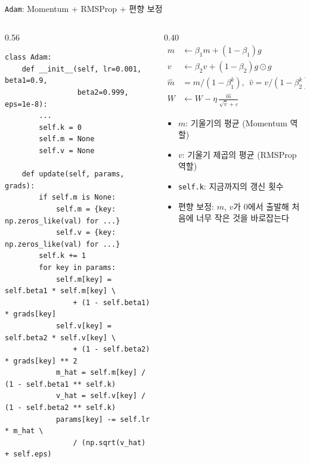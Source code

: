 \documentclass[aspectratio=169,11pt]{beamer}
\newcommand{\codetiny}{\ttfamily\fontsize{6.8}{7.6}\selectfont}
\newcommand{\code}[1]{\texttt{#1}}
\begin{document}
\begin{frame}[fragile]{\code{Adam}: Momentum + RMSProp + 편향 보정}
\begin{columns}[T,onlytextwidth]
\begin{column}{0.56\textwidth}
\begin{lstlisting}[basicstyle=\codetiny]
class Adam:
    def __init__(self, lr=0.001, beta1=0.9,
                 beta2=0.999, eps=1e-8):
        ...
        self.k = 0
        self.m = None
        self.v = None

    def update(self, params, grads):
        if self.m is None:
            self.m = {key: np.zeros_like(val) for ...}
            self.v = {key: np.zeros_like(val) for ...}
        self.k += 1
        for key in params:
            self.m[key] = self.beta1 * self.m[key] \
                + (1 - self.beta1) * grads[key]
            self.v[key] = self.beta2 * self.v[key] \
                + (1 - self.beta2) * grads[key] ** 2
            m_hat = self.m[key] / (1 - self.beta1 ** self.k)
            v_hat = self.v[key] / (1 - self.beta2 ** self.k)
            params[key] -= self.lr * m_hat \
                / (np.sqrt(v_hat) + self.eps)
\end{lstlisting}
\end{column}
\begin{column}{0.40\textwidth}
\footnotesize
\[
\begin{aligned}
m &\leftarrow \beta_1 m + (1-\beta_1) g\\
v &\leftarrow \beta_2 v + (1-\beta_2) g\odot g\\
\hat m &= m/(1-\beta_1^k),\ \ \hat v = v/(1-\beta_2^k)\\
W &\leftarrow W - \eta\,\frac{\hat m}{\sqrt{\hat v}+\varepsilon}
\end{aligned}
\]
\begin{itemize}
\item $m$: 기울기의 평균 (Momentum 역할)
\item $v$: 기울기 제곱의 평균 (RMSProp 역할)
\item \code{self.k}: 지금까지의 갱신 횟수
\item 편향 보정: $m$, $v$가 $0$에서 출발해 처음에 너무 작은 것을 바로잡는다
\end{itemize}
\end{column}
\end{columns}
\end{frame}
\end{document}
